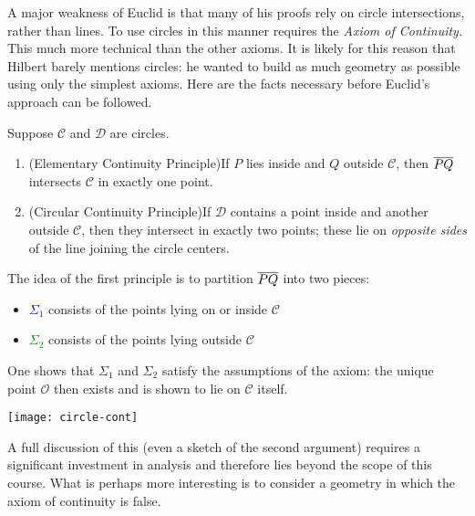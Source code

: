 A major weakness of Euclid is that many of his proofs rely on circle intersections, rather than lines. To use circles in this manner requires the \emph{Axiom of Continuity.} 
This much more technical than the other axioms. It is likely for this reason that Hilbert barely mentions circles: he wanted to build as much geometry as possible using only the simplest axioms.\smallbreak
Here are the facts necessary before Euclid's approach can be followed.

\begin{thm}{}{}
Suppose $\mathcal C$ and $\mathcal D$ are circles.\vspace{-5pt}
\begin{enumerate}\itemsep0pt
  \item (Elementary Continuity Principle)\quad If $P$ lies inside and $Q$ outside $\mathcal C$, then $\overline{PQ}$ intersects $\mathcal C$ in exactly one point.
  \item (Circular Continuity Principle)\quad If $\mathcal D$ contains a point inside and another outside $\mathcal C$, then they intersect in exactly two points; these lie on \emph{opposite sides} of the line joining the circle centers.
\end{enumerate}
\end{thm}


\begin{minipage}[t]{0.7\linewidth}\vspace{0pt}
The idea of the first principle is to partition $\overline{PQ}$ into two pieces:
\begin{itemize}\itemsep0pt
  \item[]\textcolor{blue}{$\Sigma_1$} consists of the points lying on or inside $\mathcal C$
  \item[]\textcolor{Green}{$\Sigma_2$} consists of the points lying outside $\mathcal C$
\end{itemize}
One shows that $\Sigma_1$ and $\Sigma_2$ satisfy the assumptions of the axiom: the unique point $\mathcal O$ then exists and is shown to lie on $\mathcal C$ itself.
\end{minipage}\hfill\begin{minipage}[t]{0.29\linewidth}\vspace{0pt}
\flushright \texttt{[image: circle-cont]}
\end{minipage}\smallbreak

A full discussion of this (even a sketch of the second argument) requires a significant investment in analysis and therefore lies beyond the scope of this course. What is perhaps more interesting is to consider a geometry in which the axiom of continuity is false.

